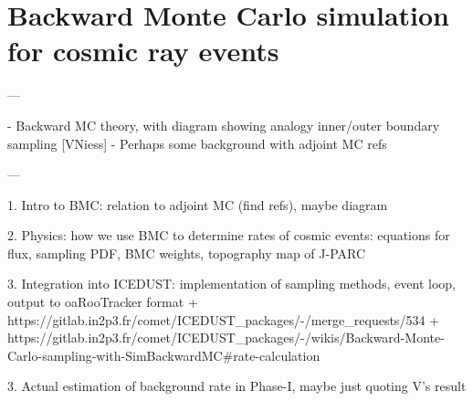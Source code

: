 \chapter{Backward Monte Carlo simulation for cosmic ray events}

\begin{markdown}
---

- Backward MC theory, with diagram showing analogy inner/outer boundary sampling [VNiess]
- Perhaps some background with adjoint MC refs

---

1. Intro to BMC: relation to adjoint MC (find refs), maybe diagram

2. Physics: how we use BMC to determine rates of cosmic events: equations for
flux, sampling PDF, BMC weights, topography map of J-PARC

3. Integration into ICEDUST: implementation of sampling methods, event loop, output to
oaRooTracker format
+ https://gitlab.in2p3.fr/comet/ICEDUST_packages/-/merge_requests/534
+ https://gitlab.in2p3.fr/comet/ICEDUST_packages/-/wikis/Backward-Monte-Carlo-sampling-with-SimBackwardMC#rate-calculation

3. Actual estimation of background rate in Phase-I, maybe just quoting V's
result


\end{markdown}